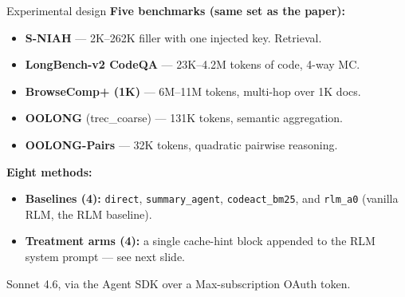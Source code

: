 \documentclass[aspectratio=169,10pt]{beamer}
\begin{document}

\begin{frame}{Experimental design}
\textbf{Five benchmarks (same set as the paper):}
\begin{itemize}\setlength{\itemsep}{0.05em}
  \item \textbf{S-NIAH} --- 2K--262K filler with one injected key. Retrieval.
  \item \textbf{LongBench-v2 CodeQA} --- 23K--4.2M tokens of code, 4-way MC.
  \item \textbf{BrowseComp+ (1K)} --- 6M--11M tokens, multi-hop over 1K docs.
  \item \textbf{OOLONG} (trec\_coarse) --- 131K tokens, semantic aggregation.
  \item \textbf{OOLONG-Pairs} --- 32K tokens, quadratic pairwise reasoning.
\end{itemize}

\vspace{0.5em}
\textbf{Eight methods:}
\begin{itemize}\setlength{\itemsep}{0.05em}
  \item \textbf{Baselines (4):} \texttt{direct}, \texttt{summary\_agent},
        \texttt{codeact\_bm25}, and \alert{\texttt{rlm\_a0}} (vanilla RLM, the RLM baseline).
  \item \textbf{Treatment arms (4):} a single cache-hint block appended to
        the RLM system prompt --- see next slide.
\end{itemize}

\vspace{0.4em}
Sonnet 4.6, via the Agent SDK over a Max-subscription OAuth token.
\end{frame}
\end{document}
